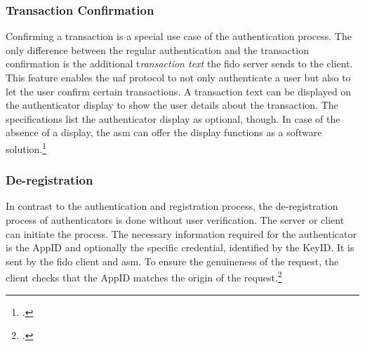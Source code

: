 \subsubsection{Transaction Confirmation}

Confirming a transaction is a special use case of the authentication process. The only difference between the regular authentication and the transaction confirmation is the additional t\textit{ransaction text} the \gls{fido} server sends to the client. This feature enables the \gls{uaf} protocol to not only authenticate a user but also to let the user confirm certain transactions. A transaction text can be displayed on the authenticator display to show the user details about the transaction. The specifications list the authenticator display as optional, though. In case of the absence of a display, the \gls{asm} can offer the display functions as a software solution.\footcites[See][4]{uaf-overview}[See][251]{Schwartz2018}

\subsubsection{De-registration}

In contrast to the authentication and registration process, the de-registration process of authenticators is done without user verification. The server or client can initiate the process. The necessary information required for the authenticator is the AppID and optionally the specific credential, identified by the KeyID. It is sent by the \gls{fido} client and \gls{asm}. To ensure the genuineness of the request, the client checks that the AppID matches the origin of the request.\footcites[See][31]{uaf-protocol}[See][7]{uaf-overview}
